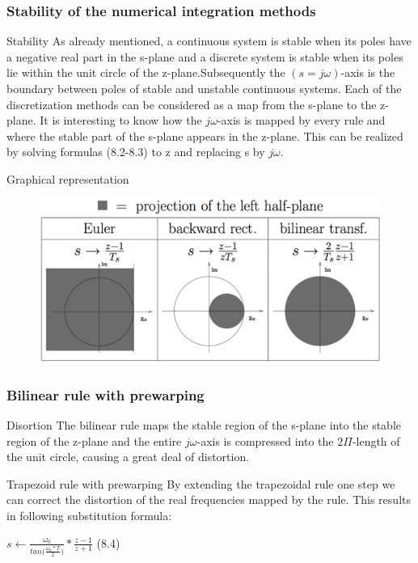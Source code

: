 \begin{frame}
	\frametitle{Stability of the numerical integration methods}
	\begin{block}{Stability}
		As already mentioned, a continuous system is stable when its poles have a negative real part in the s-plane and a discrete system is stable when its poles lie within the unit circle of the z-plane.Subsequently the $(s=j\omega)$-axis is the boundary between poles of stable and unstable continuous systems. Each of the discretization methods can be considered as a map from the s-plane to the z-plane. It is interesting to know how the $j\omega$-axis is mapped by every rule and where the stable part of the s-plane appears in the z-plane. This can be realized by solving formulas (8.2-8.3) to z and replacing s by $j\omega$. 
	\end{block}
\end{frame}

\begin{frame}
	\begin{block}{Graphical representation}
	\begin{figure}
		\centering
		\includegraphics[width=1\linewidth]{Stabiliteit}
	\end{figure}
	\end{block}
\end{frame}


\begin{frame}
	\frametitle{Bilinear rule with prewarping}
	\begin{alertblock}{Disortion}
		The bilinear rule maps the stable region of the s-plane into the stable region of the z-plane and the entire $j\omega$-axis is compressed into the $2\Pi$-length of the unit circle, causing a great deal of distortion. 
	\end{alertblock}
	
	\begin{block}{Trapezoid rule with prewarping}
		By extending the trapezoidal rule one step we can correct the distortion of the real frequencies mapped by the rule. This results in following substitution formula:
		\begin{center}
			$s \gets \frac{\omega_0}{tan\big(\frac{\omega_0 * T}{2}\big)} * \frac{z-1}{z+1}$ (8.4)
		\end{center}
	\end{block}
\end{frame}

